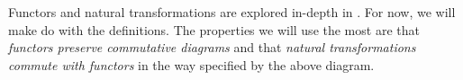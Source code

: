 
Functors and natural transformations are explored in-depth in \cite{Leinster}. For now, we will make do with the definitions. The properties we will use the most are that \textit{functors preserve commutative diagrams} and that \textit{natural transformations commute with functors} in the way specified by the above diagram. 